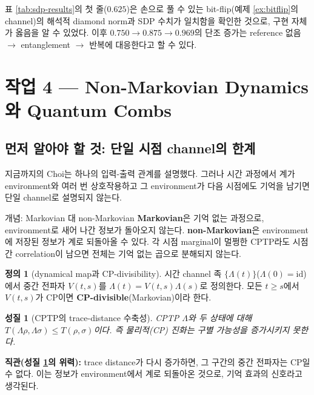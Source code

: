 \documentclass[11pt,a4paper]{article}
\newcommand{\id}{\mathrm{id}}
\theoremstyle{definition}
\newtheorem{definition}{정의}[section]
\theoremstyle{plain}
\newtheorem{property}{성질}[section]
\theoremstyle{remark}
\begin{document}
표 \ref{tab:sdp-results}의 첫 줄($0.625$)은 손으로 풀 수 있는 bit-flip(예제 \ref{ex:bitflip}의 channel)의 해석적 diamond norm과 SDP 수치가 일치함을 확인한 것으로, 구현 자체가 옳음을 알 수 있었다. 이후 $0.750\to0.875\to0.969$의 단조 증가는 reference 없음 $\to$ entanglement $\to$ 반복에 대응한다고 할 수 있다.

\section{작업 4 --- Non-Markovian Dynamics와 Quantum Combs}

\subsection{먼저 알아야 할 것: 단일 시점 channel의 한계}

지금까지의 Choi는 하나의 입력-출력 관계를 설명했다. 그러나 시간 과정에서 계가 environment와 여러 번 상호작용하고 그 environment가 다음 시점에도 기억을 남기면 단일 channel로 설명되지 않는다.

\begin{conceptbox}{개념: Markovian 대 non-Markovian}
\textbf{Markovian}은 기억 없는 과정으로, environment로 새어 나간 정보가 돌아오지 않는다. \textbf{non-Markovian}은 environment에 저장된 정보가 계로 되돌아올 수 있다. 각 시점 marginal이 멀쩡한 CPTP라도 시점 간 correlation이 남으면 전체는 기억 없는 곱으로 분해되지 않는다.
\end{conceptbox}

\begin{definition}[dynamical map과 CP-divisibility]
시간 channel 족 $\{\Lambda(t)\}$($\Lambda(0)=\id$)에서 중간 전파자 $V(t,s)$를 $\Lambda(t)=V(t,s)\Lambda(s)$로 정의한다. 모든 $t\ge s$에서 $V(t,s)$가 CP이면 \textbf{CP-divisible}(Markovian)이라 한다.
\end{definition}

\begin{property}[CPTP의 trace-distance 수축성]\label{prop:contract}
CPTP $\Lambda$와 두 상태에 대해 $T(\Lambda\rho,\Lambda\sigma)\le T(\rho,\sigma)$이다. 즉 물리적(CP) 진화는 구별 가능성을 증가시키지 못한다.
\end{property}

\begin{intuitionbox}
\textbf{직관(성질 \ref{prop:contract}의 위력):} trace distance가 다시 증가하면, 그 구간의 중간 전파자는 CP일 수 없다. 이는 정보가 environment에서 계로 되돌아온 것으로, 기억 효과의 신호라고 생각된다.
\end{intuitionbox}
\end{document}
